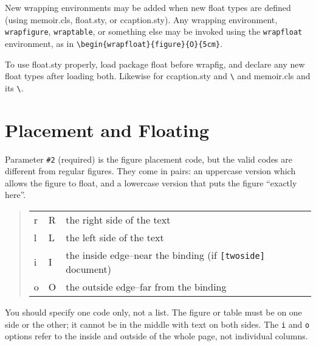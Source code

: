 \documentclass[pagesize=auto]{scrartcl}
\makeatletter
\newcommand*{\pkg}[1]{\textsf{#1}}
\newcommand*{\cls}[1]{\textsf{#1}}
\newcommand*{\cs}[1]{\texttt{\textbackslash#1}}
\newcommand*{\cmd}[1]{\cs{\expandafter\@gobble\string#1}}
\newcommand*{\env}[1]{\texttt{#1}}
\newcommand*{\opt}[1]{\texttt{#1}}
\makeatother
\begin{document}
New wrapping environments may be added when new float types are defined
(using \cls{memoir.cls}, \pkg{float.sty}, or \pkg{ccaption.sty}).  Any wrapping environment,
\env{wrapfigure}, \env{wraptable}, or something else may be invoked using the
\env{wrapfloat} environment, as in \verb+\begin{wrapfloat}{figure}{O}{5cm}+.

To use \pkg{float.sty} properly, load package \pkg{float} before \pkg{wrapfig}, 
and declare any new float types after loading both.  Likewise for
\pkg{ccaption.sty} and \cmd{\newfloatlist} and \pkg{memoir.cls} and its \cmd{\newfloat}.


\section{Placement and Floating}

Parameter \verb+#2+ (required) is the figure placement code, but the valid
codes are different from regular figures.  They come in pairs: an
uppercase version which allows the figure to float, and a lowercase
version that puts the figure ``exactly here''.
%
\begin{quote}
  \begin{tabular}{*{2}{>{\ttfamily}l}!{--}l}
    r & R & the right side of the text                                      \\
    l & L & the left side of the text                                       \\
    i & I & the inside edge--near the binding (if \opt{[twoside]} document) \\
    o & O & the outside edge--far from the binding
  \end{tabular}
\end{quote}
%
You should specify one code only, not a list.  The figure or table must
be on one side or the other; it cannot be in the middle with text on
both sides.  The \texttt{i} and \texttt{o} options refer to the inside and outside of
the whole page, not individual columns.
\end{document}

